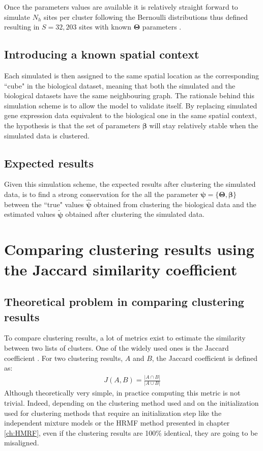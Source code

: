 	Once the parameters values are available it is relatively straight forward to simulate $N_h$ sites per cluster following the Bernoulli distributions thus defined resulting in $S=32,203$ sites with known $\boldsymbol{\Theta}$ parameters .
	\subsection{Introducing a known spatial context}\label{subsec:simul_spatial}
	Each simulated is then assigned to the same spatial location as the corresponding ``cube" in the biological dataset, meaning that both the simulated and the biological datasets have the same neighbouring graph. The rationale behind this simulation scheme is to allow the model to validate itself. By replacing simulated gene expression data equivalent to the biological one in the same spatial context, the hypothesis is that the set of parameters $\boldsymbol{\beta}$ will stay relatively stable when the simulated data is clustered.
	\subsection{Expected results}\label{subsec:expected_simul_results}
	Given this simulation scheme, the expected results after clustering the simulated data, is to find a strong conservation for the all the parameter $\boldsymbol{\psi} = \{\boldsymbol{\Theta},\boldsymbol{\beta}\}$ between the ``true" values $\hat{\boldsymbol{\psi}}$ obtained from clustering the biological data and the estimated values $\widetilde{\boldsymbol{\psi}}$ obtained after clustering the simulated data.

\section{Comparing clustering results using the Jaccard similarity coefficient}
	\subsection{Theoretical problem in comparing clustering results}
To compare clustering results, a lot of metrics exist to estimate the similarity between two lists of clusters. One of the widely used ones is the Jaccard coefficient \cite{jaccard1901}. For two clustering results, $A$ and $B$, the Jaccard coefficient is defined as: 
\begin{align*}
J(A,B) = \frac{|A \cap B|}{|A \cup B|}
\end{align*}
Although theoretically very simple, in practice computing this metric is not trivial. Indeed, depending on the clustering method used and on the initialization used for clustering methods that require an initialization step like the independent mixture models or the HRMF method presented in chapter \ref{ch:HMRF}, even if the clustering results are 100\% identical, they are going to be misaligned.\\

